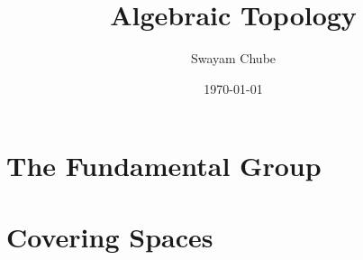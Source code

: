 \documentclass[oneside]{report}
\title{Algebraic Topology}
\author{Swayam Chube}
\date{\today}
\begin{document}
\maketitle
\tableofcontents

\chapter{The Fundamental Group}


\chapter{Covering Spaces}

\end{document}
